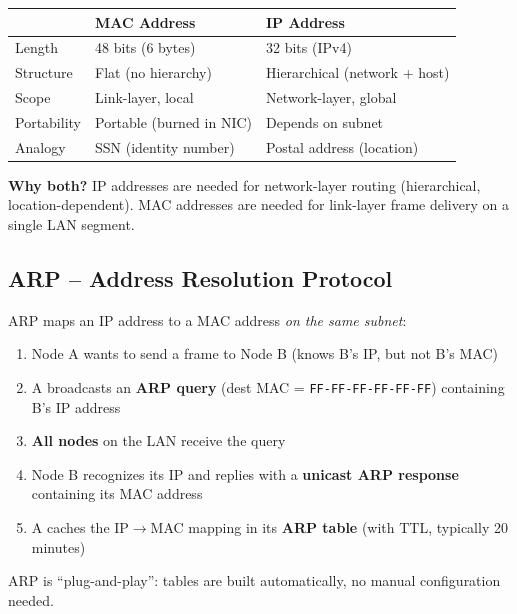 \begin{warnbox}
\begin{center}
\begin{tabular}{lll}
\toprule
& \textbf{MAC Address} & \textbf{IP Address} \\
\midrule
Length & 48 bits (6 bytes) & 32 bits (IPv4) \\
Structure & Flat (no hierarchy) & Hierarchical (network + host) \\
Scope & Link-layer, local & Network-layer, global \\
Portability & Portable (burned in NIC) & Depends on subnet \\
Analogy & SSN (identity number) & Postal address (location) \\
\bottomrule
\end{tabular}
\end{center}

\textbf{Why both?} IP addresses are needed for network-layer routing (hierarchical, location-dependent). MAC addresses are needed for link-layer frame delivery on a single LAN segment.
\end{warnbox}

\subsection{ARP -- Address Resolution Protocol}

\begin{keybox}
ARP maps an IP address to a MAC address \emph{on the same subnet}:

\begin{enumerate}[noitemsep]
    \item Node A wants to send a frame to Node B (knows B's IP, but not B's MAC)
    \item A broadcasts an \textbf{ARP query} (dest MAC = \texttt{FF-FF-FF-FF-FF-FF}) containing B's IP address
    \item \textbf{All nodes} on the LAN receive the query
    \item Node B recognizes its IP and replies with a \textbf{unicast ARP response} containing its MAC address
    \item A caches the IP$\to$MAC mapping in its \textbf{ARP table} (with TTL, typically 20 minutes)
\end{enumerate}

ARP is ``plug-and-play'': tables are built automatically, no manual configuration needed.
\end{keybox}

